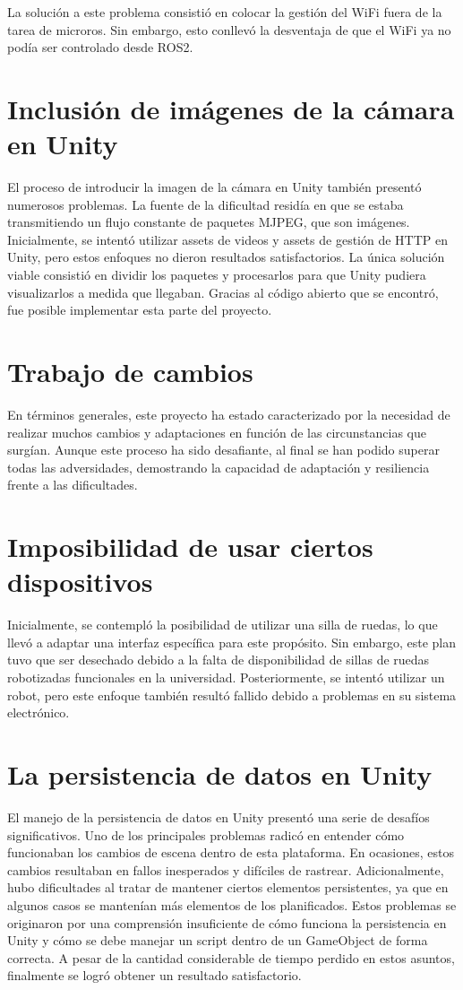 La solución a este problema consistió en colocar la gestión del WiFi fuera de la tarea de microros. Sin embargo, esto conllevó la desventaja de que el WiFi ya no podía ser controlado desde ROS2.

\section{Inclusi\'on de im\'agenes de la cámara en Unity}
El proceso de introducir la imagen de la cámara en Unity también presentó numerosos problemas. La fuente de la dificultad residía en que se estaba transmitiendo un flujo constante de paquetes MJPEG, que son imágenes. Inicialmente, se intentó utilizar assets de videos y assets de gestión de HTTP en Unity, pero estos enfoques no dieron resultados satisfactorios. La única solución viable consistió en dividir los paquetes y procesarlos para que Unity pudiera visualizarlos a medida que llegaban. Gracias al código abierto que se encontró, fue posible implementar esta parte del proyecto.

\section{Trabajo de cambios}
En términos generales, este proyecto ha estado caracterizado por la necesidad de realizar muchos cambios y adaptaciones en función de las circunstancias que surgían. Aunque este proceso ha sido desafiante, al final se han podido superar todas las adversidades, demostrando la capacidad de adaptación y resiliencia frente a las dificultades.


\section{Imposibilidad de usar ciertos dispositivos}
Inicialmente, se contempló la posibilidad de utilizar una silla de ruedas, lo que llevó a adaptar una interfaz específica para este propósito. Sin embargo, este plan tuvo que ser desechado debido a la falta de disponibilidad de sillas de ruedas robotizadas funcionales en la universidad. Posteriormente, se intentó utilizar un robot, pero este enfoque también resultó fallido debido a problemas en su sistema electrónico.


\section{La persistencia de datos en Unity}
El manejo de la persistencia de datos en Unity presentó una serie de desafíos significativos. Uno de los principales problemas radicó en entender cómo funcionaban los cambios de escena dentro de esta plataforma. En ocasiones, estos cambios resultaban en fallos inesperados y difíciles de rastrear. Adicionalmente, hubo dificultades al tratar de mantener ciertos elementos persistentes, ya que en algunos casos se mantenían más elementos de los planificados. Estos problemas se originaron por una comprensión insuficiente de cómo funciona la persistencia en Unity y cómo se debe manejar un script dentro de un GameObject de forma correcta. A pesar de la cantidad considerable de tiempo perdido en estos asuntos, finalmente se logró obtener un resultado satisfactorio.